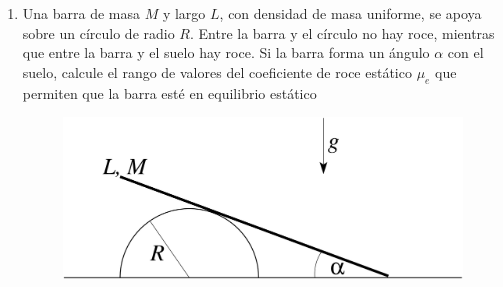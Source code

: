 \documentclass[letterpaper,11pt]{article}
\begin{document}
\begin{enumerate}
\begin{multicols}{2}
    \begin{figure}[H]
        \centering
        \texttt{[image: 2020-1/Imágenes/aux Extra-C2/semiesfera-torque.pdf]}
    \end{figure}
\end{multicols}

\item 
\begin{multicols}{2}
    Una barra de masa $M$ y largo $L$, con densidad de masa uniforme, se apoya sobre un círculo de radio $R$. Entre la barra y el círculo no hay roce, mientras que entre la barra y el suelo hay roce. Si la barra forma un ángulo $\alpha$ con el suelo, calcule el rango de valores del coeficiente de roce estático $\mu_e$ que permiten que la barra esté en equilibrio estático
    \columnbreak
    \begin{figure}[H]
        \centering
        \includegraphics[height=6.5\baselineskip]{2021-2/img/aux12/aux12-circ.PNG}
    \end{figure}
\end{multicols}




%   

\end{enumerate}
\end{document}
